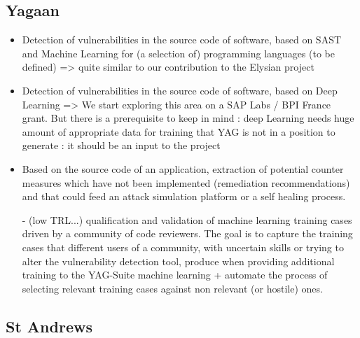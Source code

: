 \documentclass[a4paper,11pt]{article}
\begin{document}
\subsection{Yagaan}
\begin{itemize}

\item Detection of vulnerabilities in the source code of software, based on SAST and Machine Learning for (a selection of) programming languages (to be defined) => quite similar to our contribution to the Elysian project

\item Detection of vulnerabilities in the source code of software, based on Deep Learning => We start exploring this area on a SAP Labs / BPI France grant. But there is a prerequisite to keep in mind : deep Learning needs huge amount of appropriate data for training that YAG is not in a position to generate : it should be an input to the project

\item Based on the source code of an application, extraction of potential counter measures which have not been implemented (remediation recommendations) and that could feed an attack simulation platform or a self healing process.

- (low TRL...) qualification and validation of machine learning training cases driven by a community of code reviewers. The goal is to capture the training cases that different users of a community, with uncertain skills or trying to alter the vulnerability detection tool, produce when providing additional training to the YAG-Suite machine learning + automate the process of selecting relevant training cases against non relevant (or hostile) ones.

\end{itemize}

\subsection{St Andrews}
\end{document}
